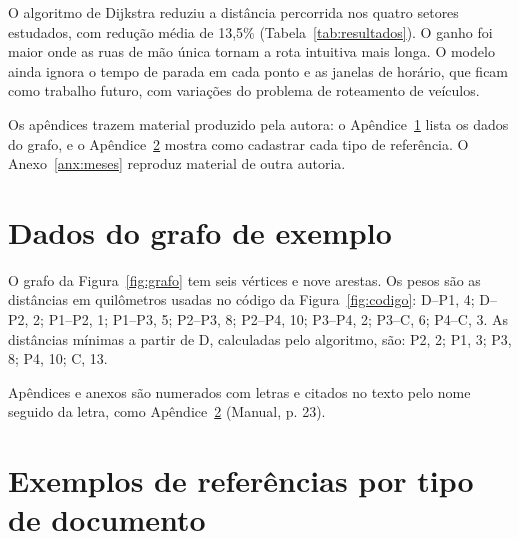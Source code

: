 \documentclass[diss,capa]{texufpel}
\begin{document}
O algoritmo de Dijkstra reduziu a distância percorrida nos quatro setores
estudados, com redução média de 13,5\% (Tabela~\ref{tab:resultados}). O ganho
foi maior onde as ruas de mão única tornam a rota intuitiva mais longa. O modelo ainda
ignora o tempo de parada em cada ponto e as janelas de horário, que ficam como
trabalho futuro, com variações do problema de roteamento de veículos.

Os apêndices trazem material produzido pela autora: o Apêndice~\ref{apx:dados}
lista os dados do grafo, e o Apêndice~\ref{apx:referencias} mostra como
cadastrar cada tipo de referência. O Anexo~\ref{anx:meses} reproduz material de
outra autoria.




\apendices

\chapter{Dados do grafo de exemplo}
\label{apx:dados}

O grafo da Figura~\ref{fig:grafo} tem seis vértices e nove arestas. Os pesos
são as distâncias em quilômetros usadas no código da
Figura~\ref{fig:codigo}: D--P1, 4; D--P2, 2; P1--P2, 1; P1--P3, 5; P2--P3, 8;
P2--P4, 10; P3--P4, 2; P3--C, 6; P4--C, 3. As distâncias mínimas a partir de
D, calculadas pelo algoritmo, são: P2, 2; P1, 3; P3, 8; P4, 10; C, 13.

Apêndices e anexos são numerados com letras e citados no texto pelo nome
seguido da letra, como Apêndice~\ref{apx:referencias} (Manual, p. 23).

\chapter{Exemplos de referências por tipo de documento}
\label{apx:referencias}
\end{document}

